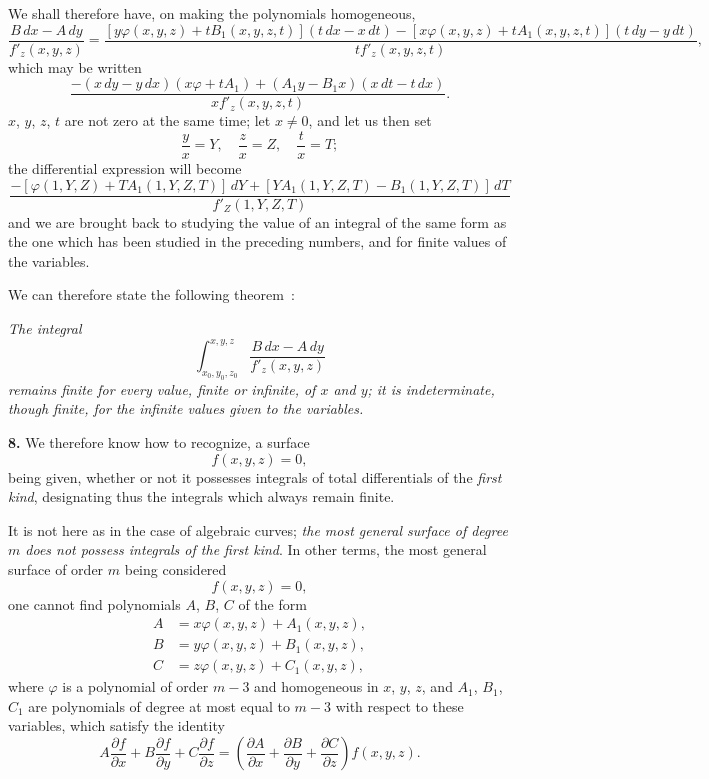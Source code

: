 \documentclass{article}
\begin{document}
We shall therefore have, on making the polynomials homogeneous,
\[
\frac{B\,dx - A\,dy}{f'_{z}(x, y, z)} = \frac{[y\varphi(x, y, z) + tB_{1}(x, y, z, t)](t\,dx - x\,dt) - [x\varphi(x, y, z) + tA_{1}(x, y, z, t)](t\,dy - y\,dt)}{tf'_{z}(x, y, z, t)},
\]
which may be written
\[
\frac{-(x\,dy - y\,dx)(x\varphi + tA_{1}) + (A_{1}y - B_{1}x)(x\,dt - t\,dx)}{xf'_{z}(x, y, z, t)}.
\]
$x$, $y$, $z$, $t$ are not zero at the same time; let $x \neq 0$, and let us then set
\[
\frac{y}{x} = Y, \quad \frac{z}{x} = Z, \quad \frac{t}{x} = T;
\]
the differential expression will become
\[
\frac{-[\varphi(1, Y, Z) + TA_{1}(1, Y, Z, T)]\,dY + [YA_{1}(1, Y, Z, T) - B_{1}(1, Y, Z, T)]\,dT}{f'_{Z}(1, Y, Z, T)}
\]
and we are brought back to studying the value of an integral of the same form as the one which has been studied in the preceding numbers, and for finite values of the variables.

We can therefore state the following theorem~:

\emph{The integral}
\[
\int_{x_{0}, y_{0}, z_{0}}^{x, y, z} \frac{B\,dx - A\,dy}{f'_{z}(x, y, z)}
\]
\emph{remains finite for every value, finite or infinite, of $x$ and $y$; it is indeterminate, though finite, for the infinite values given to the variables.}

\textbf{8.} We therefore know how to recognize, a surface
\[
f(x, y, z) = 0,
\]
being given, whether or not it possesses integrals of total differentials of the \emph{first kind}, designating thus the integrals which always remain finite.

It is not here as in the case of algebraic curves; \emph{the most general surface of degree $m$ does not possess integrals of the first kind}. In other terms, the most general surface of order $m$ being considered
\[
f(x, y, z) = 0,
\]
one cannot find polynomials $A$, $B$, $C$ of the form
\[
\begin{aligned}
A &= x\varphi(x, y, z) + A_{1}(x, y, z), \\
B &= y\varphi(x, y, z) + B_{1}(x, y, z), \\
C &= z\varphi(x, y, z) + C_{1}(x, y, z),
\end{aligned}
\]
where $\varphi$ is a polynomial of order $m - 3$ and homogeneous in $x$, $y$, $z$, and $A_{1}$, $B_{1}$, $C_{1}$ are polynomials of degree at most equal to $m - 3$ with respect to these variables, which satisfy the identity
\[
A \frac{\partial f}{\partial x} + B \frac{\partial f}{\partial y} + C \frac{\partial f}{\partial z} = \left( \frac{\partial A}{\partial x} + \frac{\partial B}{\partial y} + \frac{\partial C}{\partial z} \right) f(x, y, z).
\]
\end{document}
